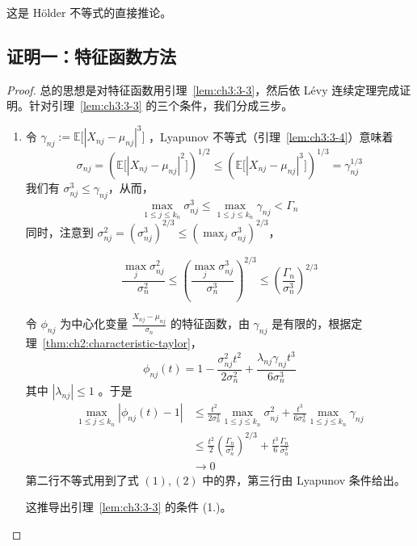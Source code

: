 这是 Hölder 不等式的直接推论。


\subsection{证明一：特征函数方法}

\begin{proof}

总的思想是对特征函数用引理~\ref{lem:ch3:3-3}，然后依 Lévy 连续定理完成证明。针对引理~\ref{lem:ch3:3-3} 的三个条件，我们分成三步。

\begin{enumerate}[label=\textbf{第\chinese*步}:, leftmargin=6em]

\item 令 $\gamma_{nj} := \mathbb{E}\big[|X_{nj} - \mu_{nj}|^3\big]$ ，Lyapunov 不等式（引理~\ref{lem:ch3:3-4}）意味着
\[\sigma_{nj} = \left(\mathbb{E}\big[|X_{nj} - \mu_{nj}|^2\big]\right)^{1 / 2}\leq \left(\mathbb{E}\big[|X_{nj} - \mu_{nj}|^3\big]\right)^{1 / 3}=\gamma_{nj}^{1/3}\]
我们有 $\sigma_{nj}^{3} \leq \gamma_{nj}$，从而，
\[\max_{1\leq j\leq k_n}\sigma_{nj}^3\leq \max_{1\leq j\leq k_n}\gamma_{nj}< \Gamma_n\]
同时，注意到 $\sigma_{nj}^{2} = (\sigma_{nj}^{3})^{2 / 3} \leq (\max_{j} \sigma_{nj}^{3})^{2 / 3}$，

\begin{equation}
\label{eq:ch3:tag-2}
\frac{\max_j \sigma_{nj}^2}{\sigma_n^2} \leq \left(\frac{\max_j \sigma_{nj}^3}{\sigma_{n}^3}\right)^{2 / 3} \leq \left(\frac{\Gamma_{n}}{\sigma_{n}^3}\right)^{2 / 3}
\end{equation}

令 $\phi_{nj}$ 为中心化变量 $\frac{X_{nj} - \mu_{nj}}{\sigma_n}$ 的特征函数，由 $\gamma_{nj}$ 是有限的，根据定理~\ref{thm:ch2:characteristic-taylor}，
\[\phi_{nj}(t) = 1 - \frac{\sigma_{nj}^2t^2}{2\sigma_n^2} +\frac{\lambda_{nj}\gamma_{nj}t^3}{6\sigma_n^3}\]
其中 $|\lambda_{nj}|\le 1$ 。于是
\[\begin{aligned} \max_{1\leq j\leq k_n}|\phi_{nj}(t) - 1|&\leq \frac{t^2}{2\sigma_n^2}\underset {1\leq j\leq k_n}{\max}\sigma_{nj}^2 +\frac{t^3}{6\sigma_n^3} \max_{1\leq j\leq k_n}\gamma_{nj}\\ &\leq \frac{t^2}{2}\left(\frac{\Gamma_n}{\sigma_n^3}\right)^{2 / 3} + \frac{t^3}{6}\frac{\Gamma_n}{\sigma_n^3}  \\ &\to 0\end{aligned}\]
第二行不等式用到了式 $(1),(2)$ 中的界，第三行由 Lyapunov 条件给出。

这推导出引理~\ref{lem:ch3:3-3} 的条件 (1.)。


\end{enumerate}
\end{proof}

